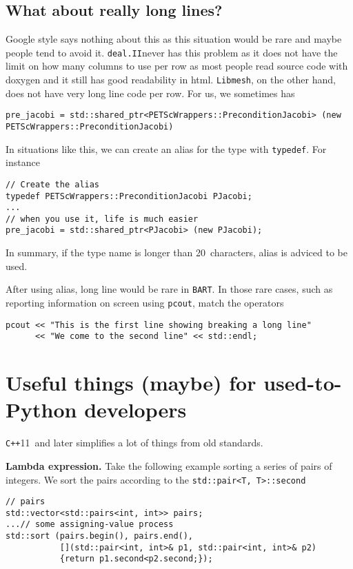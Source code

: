 \documentclass[openany]{book}
\newcommand{\bart}{{\tt BART}}
\newcommand{\libmesh}{{\tt Libmesh}}
\newcommand{\dealii}{{\tt deal.II}}
\newcommand{\cpp}{{\tt C++}}
\begin{document}
\subsection{What about really long lines?}
Google style says nothing about this as this situation would be rare and maybe people tend to avoid it. \dealii never has this problem as it does not have the limit on how many columns to use per row as most people read source code with doxygen and it still has good readability in html. \libmesh, on the other hand, does not have very long line code per row. For us, we sometimes has
\begin{lstlisting}
pre_jacobi = std::shared_ptr<PETScWrappers::PreconditionJacobi> (new PETScWrappers::PreconditionJacobi)
\end{lstlisting}

In situations like this, we can create an alias for the type with {\tt typedef}. For instance
\begin{lstlisting}
// Create the alias
typedef PETScWrappers::PreconditionJacobi PJacobi;
...
// when you use it, life is much easier
pre_jacobi = std::shared_ptr<PJacobi> (new PJacobi);
\end{lstlisting}

In summary, if the type name is longer than 20\ characters, alias is adviced to be used.

After using alias, long line would be rare in \bart. In those rare cases, such as reporting information on screen using {\tt pcout}, match the operators
\begin{lstlisting}
pcout << "This is the first line showing breaking a long line"
      << "We come to the second line" << std::endl;
\end{lstlisting}

\section{Useful things (maybe) for used-to-Python developers}
\cpp 11\ and later simplifies a lot of things from old standards.

{\bf Lambda expression.} Take the following example sorting a series of pairs of integers. We sort the pairs according to the {\tt std::pair<T, T>::second}
\begin{lstlisting}
// pairs
std::vector<std::pairs<int, int>> pairs;
...// some assigning-value process
std::sort (pairs.begin(), pairs.end(), 
           [](std::pair<int, int>& p1, std::pair<int, int>& p2)
           {return p1.second<p2.second;});
\end{lstlisting}
\end{document}

